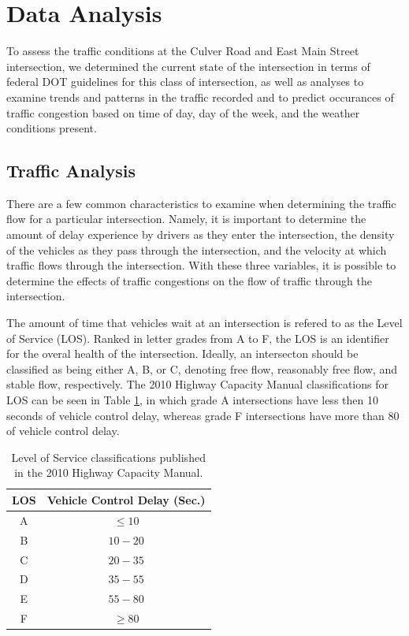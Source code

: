 \documentclass{report}
\begin{document}
\noindent
\section*{Data Analysis}

To assess the traffic conditions at the Culver Road and East Main Street
intersection, we determined the current state of the intersection in terms of
federal DOT guidelines for this class of intersection, as well as analyses to
examine trends and patterns in the traffic recorded and to predict occurances of
traffic congestion based on time of day, day of the week, and the weather
conditions present.


\subsection*{Traffic Analysis}

There are a few common characteristics to examine when determining the traffic
flow for a particular intersection. Namely, it is important to determine the
amount of delay experience by drivers as they enter the intersection, the density
of the vehicles as they pass through the intersection, and the velocity at which
traffic flows through the intersection. With these three variables, it is possible
to determine the effects of traffic congestions on the flow of traffic through
the intersection.

The amount of time that vehicles wait at an intersection is refered to as the
Level of Service (LOS). Ranked in letter grades from A to F, the LOS is an
identifier for the overal health of the intersection. Ideally, an intersecton
should be classified as being either A, B, or C, denoting free flow, reasonably
free flow, and stable flow, respectively. The 2010 Highway Capacity
Manual classifications for LOS can be seen in Table \ref{LOStable}, in which grade
A intersections have less then 10 seconds of vehicle control delay, whereas grade
F intersections have more than 80 of vehicle control delay.

\begin{table}[h]
\centering
\caption{Level of Service classifications published in the 2010 Highway Capacity
Manual.}
\begin{tabular}{c | c}
\textbf{LOS} & \textbf{Vehicle Control Delay (Sec.)}\\\hline
A & $\le 10$\\
B & $10 - 20 $\\
C & $20 - 35$\\
D & $35 - 55$\\
E & $55 - 80$\\
F & $\ge 80$\\
\end{tabular}
\label{LOStable}
\end{table}
\end{document}
